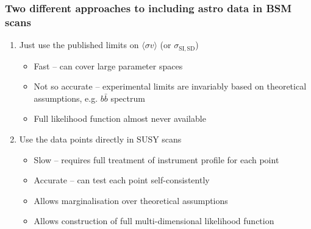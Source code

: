 \documentclass[xcolor=dvipsnames]{beamer}
\begin{document}
\begin{frame}
{}


\end{frame}

\begin{frame}
  \frametitle{Two different approaches to including astro data in BSM scans}

  \begin{enumerate}
  \item{Just use the published limits on $\langle \sigma v\rangle$ (or $\sigma_\mathrm{SI,SD}$)}
    \begin{itemize}
    \item{Fast -- can cover large parameter spaces}
    \item{Not so accurate -- experimental limits are invariably based on theoretical assumptions, e.g. $b\bar b$ spectrum}
    \item{Full likelihood function almost never available}
    \end{itemize}
  \item\alert<2-3>{Use the data points directly in SUSY scans} 
    \begin{itemize}
    \item{Slow -- requires full treatment of instrument profile for each point}
    \item{Accurate -- can test each point self-consistently}
    \item{Allows marginalisation over theoretical assumptions}
    \item{Allows construction of full multi-dimensional likelihood function}
    \end{itemize}
  \end{enumerate}

\end{frame}
\end{document}
